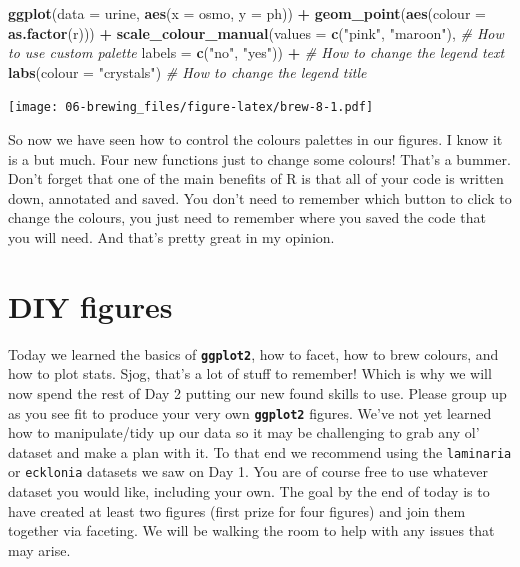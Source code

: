 \documentclass[]{book}
\newenvironment{Shaded}{\begin{snugshade}}{\end{snugshade}}
\newcommand{\KeywordTok}[1]{\textcolor[rgb]{0.13,0.29,0.53}{\textbf{#1}}}
\newcommand{\DataTypeTok}[1]{\textcolor[rgb]{0.13,0.29,0.53}{#1}}
\newcommand{\StringTok}[1]{\textcolor[rgb]{0.31,0.60,0.02}{#1}}
\newcommand{\CommentTok}[1]{\textcolor[rgb]{0.56,0.35,0.01}{\textit{#1}}}
\newcommand{\OperatorTok}[1]{\textcolor[rgb]{0.81,0.36,0.00}{\textbf{#1}}}
\newcommand{\NormalTok}[1]{#1}
\theoremstyle{definition}
\theoremstyle{definition}
\theoremstyle{definition}
\theoremstyle{remark}
\begin{document}
\begin{Shaded}
\begin{Highlighting}[]
\KeywordTok{ggplot}\NormalTok{(}\DataTypeTok{data =}\NormalTok{ urine, }\KeywordTok{aes}\NormalTok{(}\DataTypeTok{x =}\NormalTok{ osmo, }\DataTypeTok{y =}\NormalTok{ ph)) }\OperatorTok{+}
\StringTok{  }\KeywordTok{geom_point}\NormalTok{(}\KeywordTok{aes}\NormalTok{(}\DataTypeTok{colour =} \KeywordTok{as.factor}\NormalTok{(r))) }\OperatorTok{+}
\StringTok{  }\KeywordTok{scale_colour_manual}\NormalTok{(}\DataTypeTok{values =} \KeywordTok{c}\NormalTok{(}\StringTok{"pink"}\NormalTok{, }\StringTok{"maroon"}\NormalTok{), }\CommentTok{# How to use custom palette}
                     \DataTypeTok{labels =} \KeywordTok{c}\NormalTok{(}\StringTok{"no"}\NormalTok{, }\StringTok{"yes"}\NormalTok{)) }\OperatorTok{+}\StringTok{ }\CommentTok{# How to change the legend text}
\StringTok{  }\KeywordTok{labs}\NormalTok{(}\DataTypeTok{colour =} \StringTok{"crystals"}\NormalTok{) }\CommentTok{# How to change the legend title}
\end{Highlighting}
\end{Shaded}

\texttt{[image: 06-brewing\_files/figure-latex/brew-8-1.pdf]}

So now we have seen how to control the colours palettes in our figures.
I know it is a but much. Four new functions just to change some colours!
That's a bummer. Don't forget that one of the main benefits of R is that
all of your code is written down, annotated and saved. You don't need to
remember which button to click to change the colours, you just need to
remember where you saved the code that you will need. And that's pretty
great in my opinion.

\section{DIY figures}\label{diy-figures}

Today we learned the basics of \textbf{\texttt{ggplot2}}, how to facet,
how to brew colours, and how to plot stats. Sjog, that's a lot of stuff
to remember! Which is why we will now spend the rest of Day 2 putting
our new found skills to use. Please group up as you see fit to produce
your very own \textbf{\texttt{ggplot2}} figures. We've not yet learned
how to manipulate/tidy up our data so it may be challenging to grab any
ol' dataset and make a plan with it. To that end we recommend using the
\texttt{laminaria} or \texttt{ecklonia} datasets we saw on Day 1. You
are of course free to use whatever dataset you would like, including
your own. The goal by the end of today is to have created at least two
figures (first prize for four figures) and join them together via
faceting. We will be walking the room to help with any issues that may
arise.
\end{document}
